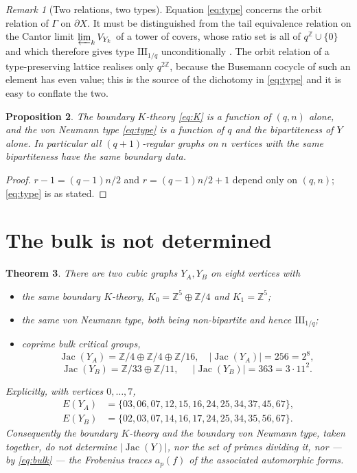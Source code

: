 \documentclass[11pt]{article}
\theoremstyle{plain}
\newtheorem{theorem}{Theorem}
\newtheorem{proposition}[theorem]{Proposition}
\theoremstyle{remark}
\newtheorem{remark}[theorem]{Remark}
\newcommand{\Z}{\mathbb{Z}}
\newcommand{\Jac}{\operatorname{Jac}}
\newcommand{\III}{\mathrm{III}}
\begin{document}
\begin{remark}[Two relations, two types]\label{rem:tworel}
Equation \eqref{eq:type} concerns the orbit relation of $\Gamma$ on $\partial X$. It must
be distinguished from the tail equivalence relation on the Cantor limit
$\varprojlim_kV_{Y_k}$ of a tower of covers, whose ratio set is all of $q^{\Z}\cup\{0\}$
and which therefore gives type $\III_{1/q}$ unconditionally \cite[III]{ANCFT}. The orbit
relation of a type-preserving lattice realises only $q^{2\Z}$, because the Busemann cocycle
of such an element has even value; this is the source of the dichotomy in \eqref{eq:type}
and it is easy to conflate the two.
\end{remark}

\begin{proposition}\label{prop:coarse}
The boundary $K$-theory \eqref{eq:K} is a function of $(q,n)$ alone, and the von Neumann
type \eqref{eq:type} is a function of $q$ and the bipartiteness of $Y$ alone. In
particular all $(q{+}1)$-regular graphs on $n$ vertices with the same bipartiteness have
the same boundary data.
\end{proposition}

\begin{proof}
$r-1=(q-1)n/2$ and $r=(q-1)n/2+1$ depend only on $(q,n)$; \eqref{eq:type} is as stated.
\end{proof}

\section{The bulk is not determined}\label{sec:main}

\begin{theorem}\label{thm:main}
There are two cubic graphs $Y_A,Y_B$ on eight vertices with
\begin{itemize}
\item the same boundary $K$-theory, $K_0=\Z^{5}\oplus\Z/4$ and $K_1=\Z^{5}$;
\item the same von Neumann type, both being non-bipartite and hence $\III_{1/q}$;
\item coprime bulk critical groups,
\[
\Jac(Y_A)=\Z/4\oplus\Z/4\oplus\Z/16,\quad |\Jac(Y_A)|=256=2^{8},
\]
\[
\Jac(Y_B)=\Z/33\oplus\Z/11,\quad\ \ |\Jac(Y_B)|=363=3\cdot11^{2}.
\]
\end{itemize}
Explicitly, with vertices $0,\dots,7$,
\[
\begin{aligned}
E(Y_A)&=\{03,06,07,12,15,16,24,25,34,37,45,67\},\\
E(Y_B)&=\{02,03,07,14,16,17,24,25,34,35,56,67\}.
\end{aligned}
\]
Consequently the boundary $K$-theory and the boundary von Neumann type, taken together, do
not determine $|\Jac(Y)|$, nor the set of primes dividing it, nor --- by \eqref{eq:bulk}
--- the Frobenius traces $a_p(f)$ of the associated automorphic forms.
\end{theorem}
\end{document}
